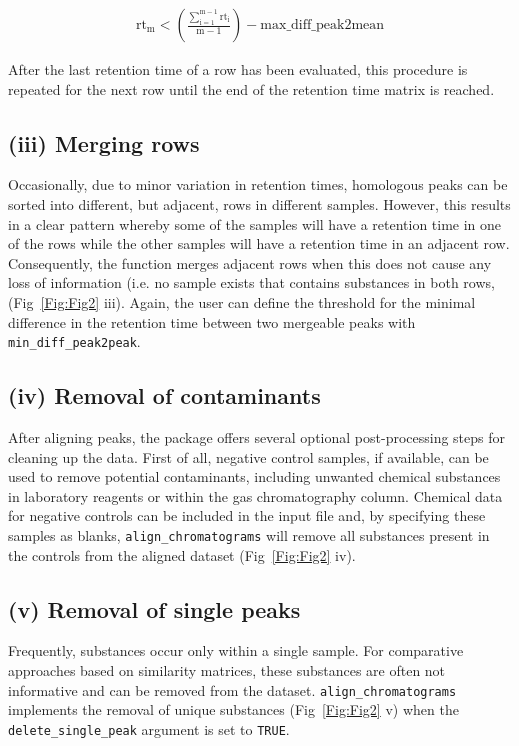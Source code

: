 \documentclass[10pt,letterpaper]{article}
\begin{document}
\begin{eqnarray}
\label{Eq:two}
\mathrm{rt_m} < \left(\frac{\mathrm{\sum_{i=1}^{m-1}rt_{i}}}{\mathrm{m}-1}\right) - \mathrm{max\_diff\_peak2mean}
\end{eqnarray}

After the last retention time of a row has been evaluated, this procedure is repeated for the next row until the end of the retention time matrix is reached.

\subsection*{(iii)  Merging rows}
Occasionally, due to minor variation in retention times, homologous peaks can be sorted into different, but adjacent, rows in different samples. However, this results in a clear pattern whereby some of the samples will have a retention time in one of the rows while the other samples will have a retention time in an adjacent row. Consequently, the function merges adjacent rows when this does not cause any loss of information (i.e. no sample exists that contains substances in both rows, (Fig~\ref{Fig:Fig2} iii). Again, the user can define the threshold for the minimal difference in the retention time between two mergeable peaks with \texttt{min\_diff\_peak2peak}. \par 

\subsection*{(iv) Removal of contaminants}
After aligning peaks, the package offers several optional post-processing steps for cleaning up the data. First of all, negative control samples, if available, can be used to remove potential contaminants, including unwanted chemical substances in laboratory reagents or within the gas chromatography column. Chemical data for negative controls can be included in the input file and, by specifying these samples as blanks, \texttt{align\_chromatograms} will remove all substances present in the controls from the aligned dataset (Fig~\ref{Fig:Fig2} iv).

\subsection*{(v) Removal of single peaks}
Frequently, substances occur only within a single sample. For comparative approaches based on similarity matrices, these substances are often not informative and can be removed from the dataset. \texttt{align\_chromatograms} implements the removal of unique substances (Fig~\ref{Fig:Fig2} v) when the \texttt{delete\_single\_peak} argument is set to \texttt{TRUE}.
\end{document}
